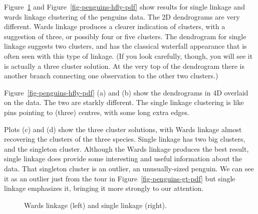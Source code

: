 \documentclass[
  letterpaper,
]{krantz}
\begin{document}
Figure~\ref{fig-penguins-ddw} and Figure~\ref{fig-penguins-hfly-pdf}
show results for single linkage and wards linkage clustering of the
penguins data. The 2D dendrograms are very different. Wards linkage
produces a clearer indication of clusters, with a suggestion of three,
or possibly four or five clusters. The dendrogram for single linkage
suggests two clusters, and has the classical waterfall appearance that
is often seen with this type of linkage. (If you look carefully, though,
you will see it is actually a three cluster solution. At the very top of
the dendrogram there is another branch connecting one observation to the
other two clusters.)

Figure~\ref{fig-penguins-hfly-pdf} (a) and (b) show the dendrograms in
4D overlaid on the data. The two are starkly different. The single
linkage clustering is like pins pointing to (three) centres, with some
long extra edges.

Plots (c) and (d) show the three cluster solutions, with Wards linkage
almost recovering the clusters of the three species. Single linkage has
two big clusters, and the singleton cluster. Although the Wards linkage
produces the best result, single linkage does provide some interesting
and useful information about the data. That singleton cluster is an
outlier, an unusually-sized penguin. We can see it as an outlier just
from the tour in Figure~\ref{fig-penguins-gt-pdf} but single linkage
emphasizes it, bringing it more strongly to our attention.

\begin{figure}


\caption{\label{fig-penguins-ddw}Wards linkage (left) and single linkage
(right).}

\end{figure}%
\end{document}
